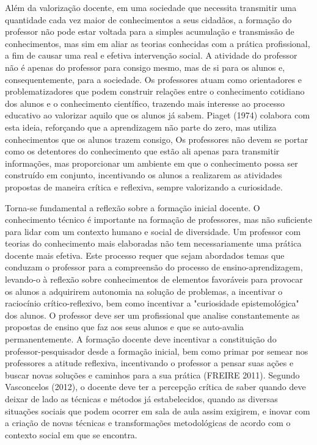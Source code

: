 \begin{itemize}
    
	Além da valorização docente, em uma sociedade que necessita transmitir uma quantidade cada vez maior de conhecimentos a seus cidadãos, a formação do professor não pode estar voltada para a simples acumulação e transmissão de conhecimentos, mas sim em aliar as teorias conhecidas com a prática profissional, a fim de causar uma real e efetiva intervenção social. A atividade do professor não é apenas do professor para consigo mesmo, mas de si para os alunos e, consequentemente, para a sociedade. Os professores atuam como orientadores e problematizadores que podem construir relações entre o conhecimento cotidiano dos alunos e o conhecimento científico, trazendo mais interesse ao processo educativo ao valorizar aquilo que os alunos já sabem. Piaget (1974) colabora com esta ideia, reforçando que a aprendizagem não parte do zero, mas utiliza conhecimentos que os alunos trazem consigo, Os professores não devem se portar como os detentores do conhecimento que estão ali apenas para transmitir informações, mas proporcionar um ambiente em que o conhecimento possa ser construído em conjunto, incentivando os alunos a realizarem as atividades propostas de maneira crítica e reflexiva, sempre valorizando a curiosidade.
    
    
	Torna-se fundamental a reflexão sobre a formação inicial docente. O conhecimento técnico é importante na formação de professores, mas não suficiente para lidar com um contexto humano e social de diversidade. Um professor com teorias do conhecimento mais elaboradas não tem necessariamente uma prática docente mais efetiva. Este processo requer que sejam abordados temas que conduzam o professor para a compreensão do processo de ensino-aprendizagem, levando-o à reflexão sobre conhecimentos de elementos favoráveis para provocar os alunos a adquirirem autonomia na solução de problemas, a incentivar o raciocínio crítico-reflexivo, bem como incentivar a "curiosidade epistemológica" dos alunos. O professor deve ser um profissional que analise constantemente as propostas de ensino que faz aos seus alunos e que se auto-avalia permanentemente. A formação docente deve incentivar a constituição do professor-pesquisador desde a formação inicial, bem como primar por semear nos professores a atitude reflexiva,  incentivando o professor a pensar suas ações e buscar novas soluções e caminhos para a sua prática (FREIRE 2011). Segundo Vasconcelos (2012), o docente deve ter a percepção crítica de saber quando deve deixar de lado as técnicas e métodos já estabelecidos, quando as diversas situações sociais que podem ocorrer em sala de aula assim exigirem, e inovar com a criação de novas técnicas e transformações metodológicas de acordo com o contexto social em que se encontra.	
    

\end{itemize}
